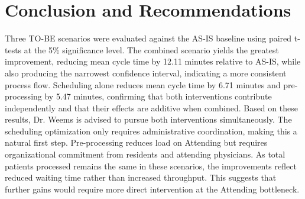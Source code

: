\section{Conclusion and Recommendations}

Three TO-BE scenarios were evaluated against the AS-IS baseline using paired t-tests at the 5\% significance level. The combined scenario yields the greatest improvement, reducing mean cycle time by 12.11 minutes relative to AS-IS, while also producing the narrowest confidence interval, indicating a more consistent process flow. Scheduling alone reduces mean cycle time by 6.71 minutes and pre-processing by 5.47 minutes, confirming that both interventions contribute independently and that their effects are additive when combined. Based on these results, Dr. Weems is advised to pursue both interventions simultaneously. The scheduling optimization only requires administrative coordination, making this a natural first step. Pre-processing reduces load on Attending but requires organizational commitment from residents and attending physicians. As total patients processed remains the same in these scenarios, the improvements reflect reduced waiting time rather than increased throughput. This suggests that further gains would require more direct intervention at the Attending bottleneck. 
